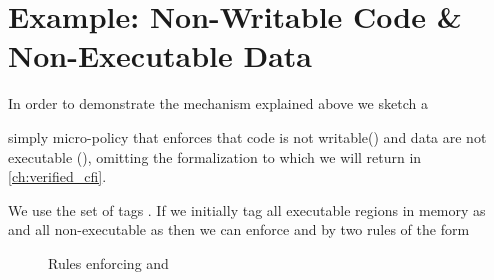 \section{Example:
  Non-Writable Code \& Non-Executable Data}
\label{sec:nwc_nxd}




In order to demonstrate the mechanism explained above we sketch a

simply micro-policy that enforces that code is not writable(\NWC) and
data are not executable (\NXD), omitting the formalization to which we
will return in \cref{ch:verified_cfi}.

We use the set of tags \TAGS{\DATA,\INSTRname}. If we initially tag
all executable regions in memory as \INSTRname and all non-executable
as \DATAname then we can enforce \NWC and \NXD by two rules of the form

\begin{figure}[htb!]
\bigskip

\bigskip

\caption{Rules enforcing \NWC and \NXD}
\end{figure}

